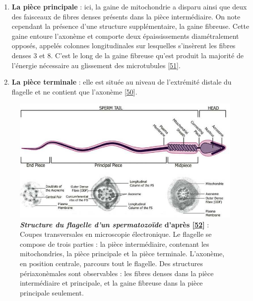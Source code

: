\documentclass[12pt,a4paper,twoside]{ugathesis}
\providecommand{\tightlist}{%
  \setlength{\itemsep}{0pt}\setlength{\parskip}{0pt}}
\theoremstyle{definition}
\theoremstyle{definition}
\theoremstyle{definition}
\theoremstyle{remark}
\begin{document}
\newpage

\begin{enumerate}
\def\labelenumi{\arabic{enumi}.}
\setcounter{enumi}{1}
\tightlist
\item
  \textbf{La pièce principale} : ici, la gaine de mitochondrie a disparu
  ainsi que deux des faisceaux de fibres denses présents dans la pièce
  intermédiaire. On note cependant la présence d'une structure
  supplémentaire, la gaine fibreuse. Cette gaine entoure l'axonème et
  comporte deux épaississements diamétralement opposés, appelés colonnes
  longitudinales sur lesquelles s'insèrent les fibres denses 3 et 8.
  C'est le long de la gaine fibreuse qu'est produit la majorité de
  l'énergie nécessaire au glissement des microtubules
  {[}\protect\hyperlink{ref-Eddy2007}{51}{]}.\\
\item
  \textbf{La pièce terminale} : elle est située au niveau de l'extrémité
  distale du flagelle et ne contient que l'axonème
  {[}\protect\hyperlink{ref-Inaba2003}{50}{]}.
\end{enumerate}

\begin{figure}

{\centering \includegraphics[scale=.55]{figure/sperm2} 

}

\caption[Structure du flagelle d’un spermatozoïde]{\textbf{\emph{Structure du flagelle d'un spermatozoïde}
d'après {[}\protect\hyperlink{ref-Borg2010}{52}{]}} : Coupes
transversales en microscopie électronique. Le flagelle se compose de
trois parties : la pièce intermédiaire, contenant les mitochondries, la
pièce principale et la pièce terminale. L'axonème, en position centrale,
parcours tout le flagelle. Des structures périaxonèmales sont
observables : les fibres denses dans la pièce intermédiaire et
principale, et la gaine fibreuse dans la pièce principale seulement.}\label{fig:flagelle}
\end{figure}
\end{document}
